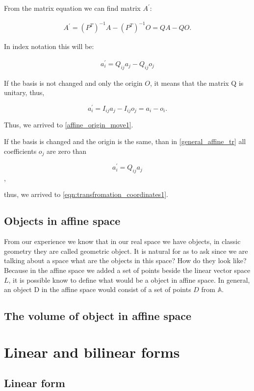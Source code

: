 \documentclass{book}
\begin{document}
From the matrix equation we can find matrix $A^'$:

\begin{align*}
A^{'} = (P^T)^{-1}A - (P^T)^{-1}O = QA - QO.
\end{align*}

In index notation this will be:

\begin{align}
a^{'}_i = Q_{ij}a_j - Q_{ij}o_j \label{general_affine_tr}
\end{align}

If the basis is not changed and only the origin $O$, it means that the matrix Q is unitary, thus,

\[a^{'}_i = I_{ij}a_j - I_{ij}o_j = a_i - o_i.\]

Thus, we arrived to \eqref{affine_origin_move1}.

If the basis is changed and the origin is the same, than in \eqref{general_affine_tr} all coefficients $o_j$ are zero than

\[a^{'}_i = Q_{ij}a_j\],

thus, we arrived to \eqref{eqn:transfromation_coordinates1}.

\section{Objects in affine space}

From our experience we know that in our real space we have objects, in classic geometry they are called geometric object. It is natural for as to ask since we are talking about a space what are the objects in this space? How do they look like? Because in the affine space we added a set of points beside the linear vector space $L$, it is possible know to define what would be a object in affine space. In general, an object D in the affine space would consist of a set of points $D$ from $\mathbb{A}$.

\section{The volume of object in affine space}

\chapter{Linear and bilinear forms}

\section{Linear form}
\end{document}
